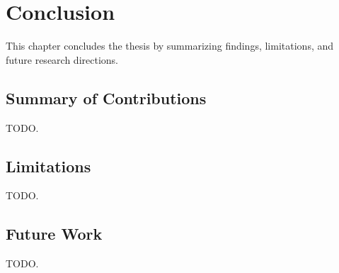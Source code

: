 \chapter{Conclusion}
\label{ch:conclusion}

This chapter concludes the thesis by summarizing findings, limitations, and future research directions.

\section{Summary of Contributions}
TODO.

\section{Limitations}
TODO.

\section{Future Work}
TODO.
